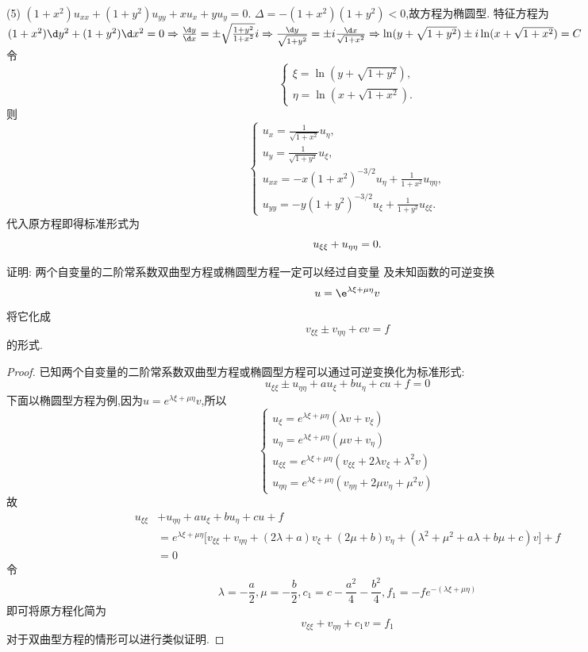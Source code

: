 \begin{solve}
  (5) $(1+x^2)u_{xx}+(1+y^2)u_{yy}+xu_x+yu_y=0$.
  $\Delta=-(1+x^2)(1+y^2)<0$,故方程为椭圆型.
  特征方程为$(1+x^2)\d y^2+(1+y^2)\d x^2=0\Rightarrow\frac{\d y}{\d x}=\pm\sqrt{\frac{1+y^2}{1+x^2}}i\Rightarrow\frac{\d y}{\sqrt{1+y^2}}=\pm i\frac{\d x}{\sqrt{1+x^2}}\Rightarrow\ln(y+\sqrt{1+y^2})\pm i\ln(x+\sqrt{1+x^2})=C$\\
  令
  \[\begin{cases}
  \xi = \ln(y+\sqrt{1+y^2}), \\
  \eta=\ln(x+\sqrt{1+x^2}).
  \end{cases}\]
  则
  \[\begin{cases}
    u_x = \frac{1}{\sqrt{1+x^2}}u_{\eta}, \\
    u_y = \frac{1}{\sqrt{1+y^2}}u_{\xi}, \\
    u_{xx} = -x(1+x^2)^{-3/2}u_{\eta}+\frac{1}{1+x^2}u_{\eta\eta}, \\
    u_{yy} = -y(1+y^2)^{-3/2}u_{\xi}+\frac{1}{1+y^2}u_{\xi\xi}.
  \end{cases}\]
  代入原方程即得标准形式为
  \[u_{\xi\xi}+u_{\eta\eta}=0. \qedhere\]
\end{solve}


\begin{exercise}
  证明: 两个自变量的二阶常系数双曲型方程或椭圆型方程一定可以经过自变量
  及未知函数的可逆变换
  \[u = \e^{\lambda\xi + \mu\eta} v\]
  将它化成
  \[v_{\xi\xi} \pm v_{\eta\eta} + cv = f\]
  的形式.
\end{exercise}

\begin{proof}
  已知两个自变量的二阶常系数双曲型方程或椭圆型方程可以通过可逆变换化为标准形式:
  \[u_{\xi\xi}\pm u_{\eta\eta}+au_{\xi}+bu_{\eta}+cu+f=0\]
  下面以椭圆型方程为例,因为$u=e^{\lambda\xi+\mu\eta}v$,所以
  \[\begin{cases}
  u_{\xi}=e^{\lambda\xi+\mu\eta}(\lambda v+v_{\xi})\\
  u_{\eta}=e^{\lambda\xi+\mu\eta}(\mu v+v_{\eta})\\
  u_{\xi\xi}=e^{\lambda\xi+\mu\eta}(v_{\xi\xi}+2\lambda v_{\xi}+\lambda^2v)\\
  u_{\eta\eta}=e^{\lambda\xi+\mu\eta}(v_{\eta\eta}+2\mu v_{\eta}+\mu^2v)
  \end{cases}\]
  故
  \[\begin{split}
  u_{\xi\xi}&+u_{\eta\eta}+au_{\xi}+bu_{\eta}+cu+f\\
  &=e^{\lambda\xi+\mu\eta}\big[v_{\xi\xi}+v_{\eta\eta}+(2\lambda+a)v_{\xi}+(2\mu+b)v_{\eta}+(\lambda^2+\mu^2+a\lambda+b\mu+c)v\big]+f\\
  &=0
  \end{split}\]
  令\[\lambda=-\frac{a}{2},\mu=-\frac{b}{2},c_1=c-\frac{a^2}{4}-\frac{b^2}{4},f_1=-fe^{-(\lambda\xi+\mu\eta)}\]
  即可将原方程化简为
  \[v_{\xi\xi}+v_{\eta\eta}+c_1v=f_1\]
  对于双曲型方程的情形可以进行类似证明.
\end{proof}


